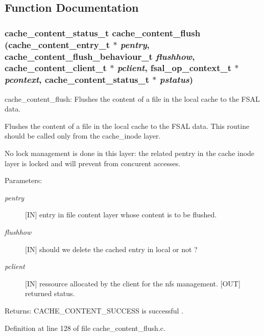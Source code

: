 \subsection{Function Documentation}
\subsubsection[{cache\_\-content\_\-flush}]{\setlength{\rightskip}{0pt plus 5cm}cache\_\-content\_\-status\_\-t cache\_\-content\_\-flush (cache\_\-content\_\-entry\_\-t $\ast$ {\em pentry}, \/  cache\_\-content\_\-flush\_\-behaviour\_\-t {\em flushhow}, \/  cache\_\-content\_\-client\_\-t $\ast$ {\em pclient}, \/  fsal\_\-op\_\-context\_\-t $\ast$ {\em pcontext}, \/  cache\_\-content\_\-status\_\-t $\ast$ {\em pstatus})}\label{cache__content__flush_8c_c66f7369f13dd6fec79abfccabde8a18}


cache\_\-content\_\-flush: Flushes the content of a file in the local cache to the FSAL data.

Flushes the content of a file in the local cache to the FSAL data. This routine should be called only from the cache\_\-inode layer.

No lock management is done in this layer: the related pentry in the cache inode layer is locked and will prevent from concurent accesses.

\begin{Desc}
\item[Parameters:]
\begin{description}
\item[{\em pentry}][IN] entry in file content layer whose content is to be flushed. \item[{\em flushhow}][IN] should we delete the cached entry in local or not ? \item[{\em pclient}][IN] ressource allocated by the client for the nfs management.  [OUT] returned status.\end{description}
\end{Desc}
\begin{Desc}
\item[Returns:]CACHE\_\-CONTENT\_\-SUCCESS is successful . \end{Desc}


Definition at line 128 of file cache\_\-content\_\-flush.c.

